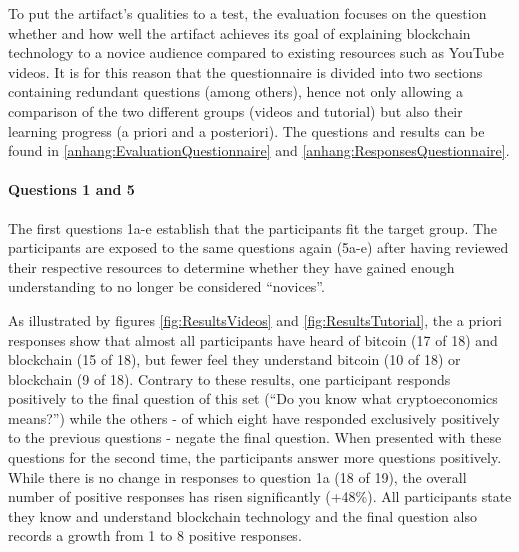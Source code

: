 To put the artifact's qualities to a test, the evaluation focuses on the question whether and how well the artifact achieves its goal of explaining blockchain technology to a novice audience compared to existing resources such as YouTube videos. It is for this reason that the questionnaire is divided into two sections containing redundant questions (among others), hence not only allowing a comparison of the two different groups (videos and tutorial) but also their learning progress (a priori and a posteriori). The questions and results can be found in \ref{anhang:EvaluationQuestionnaire} and \ref{anhang:ResponsesQuestionnaire}.

\paragraph{Questions 1 and 5}The first questions 1a-e establish that the participants fit the target group. The participants are exposed to the same questions again (5a-e) after having reviewed their respective resources to determine whether they have gained enough understanding to no longer be considered \enquote{novices}.

As illustrated by figures \ref{fig:ResultsVideos} and \ref{fig:ResultsTutorial}, the a priori responses show that almost all participants have heard of bitcoin (17 of 18) and blockchain (15 of 18), but fewer feel they understand bitcoin (10 of 18) or blockchain (9 of 18). Contrary to these results, one participant responds positively to the final question of this set (\enquote{Do you know what cryptoeconomics means?}) while the others - of which eight have responded exclusively positively to the previous questions - negate the final question. When presented with these questions for the second time, the participants answer more questions positively. While there is no change in responses to question 1a (18 of 19), the overall number of positive responses has risen significantly (+48\%). All participants state they know and understand blockchain technology and the final question also records a growth from 1 to 8 positive responses.

